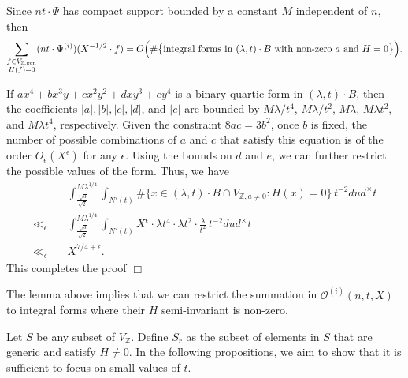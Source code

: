 \documentclass{article}
\def\gen{{\rm gen}}
\newenvironment{proof}{\noindent {\bf Proof:}}{$\Box$ \vspace{2 ex}}
\def \Bo{{\mathcal{O}^{(i)}(n,t,X)}}
\def \dw{{t^{-2}dud^\times t  }}
\def \f{ax^4+bx^3y+cx^2y^2+dxy^3+ey^4}
\begin{document}
\begin{proof}
Since $nt \cdot \Psi$ has compact support bounded by a constant $M$ independent of $n$, then
\begin{equation*}
  \sum_{\substack{f \in V_{\mathbb{Z}, \gen} \\ H(f) = 0}} (nt \cdot \Psi^{(i)})(X^{-1/2} \cdot f)  =O\Big(\#\big\{\text{integral forms in } (\lambda, t) \cdot B \text{ with non-zero } a\ \text{and } H=0\big\}\Big).
\end{equation*}

If $\f$ is a binary quartic form in $(\lambda, t) \cdot B$, then the coefficients $|a|, |b|, |c|, |d|$, and $|e|$ are bounded by $M\lambda/t^4$, $M\lambda/t^2$, $M\lambda$, $M\lambda t^2$, and $M\lambda t^4$, respectively. Given the constraint $8ac = 3b^2$, once $b$ is fixed, the number of possible combinations of $a$ and $c$ that satisfy this equation is of the order $O_{\epsilon}(X^{\epsilon})$ for any $\epsilon$. Using the bounds on $d$ and $e$, we can further restrict the possible values of the form. Thus, we have
\begin{align*}
 &\int_{\frac{\sqrt[4]{3}}{\sqrt{2}}}^{M\lambda^{1/4}} \int_{N'(t)}  
    \# \{x \in (\lambda, t) \cdot B \cap V_{\mathbb{Z}, a \neq 0} : H(x) = 0 \} \, \dw \\
 \ll_{\epsilon}\quad  &\int_{\frac{\sqrt[4]{3}}{\sqrt{2}}}^{M\lambda^{1/4}} \int_{N'(t)} 
    X^{\epsilon} \cdot \lambda t^4 \cdot \lambda t^2 \cdot \frac{\lambda}{t^2} \, \dw \\
 \ll_{\epsilon} \quad &X^{7/4 + \epsilon}.
\end{align*}
This completes the proof
\end{proof}

The lemma above implies that we can restrict the summation in $\Bo$ to integral forms where their $H$ semi-invariant is non-zero.
 
Let $S$ be any subset of $V_{\mathbb{Z}}$. Define $S_r$ as the subset of elements in $S$ that are generic and satisfy $H \neq 0$. In the following propositions, we aim to show that it is sufficient to focus on small values of $t$.
\end{document}
